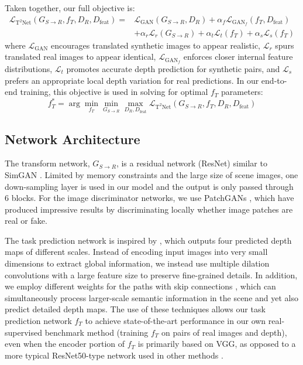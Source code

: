 \documentclass[runningheads]{llncs}
\begin{document}
Taken together, our full objective is:
\begin{align}\label{eq:6}
\mathcal{L}_{\text{T}^2\text{Net}}(G_{S\to R}, f_T, D_R,D_\text{feat}) =
& \mathcal{L}_\text{GAN}(G_{S\to R}, D_R) +  \alpha_{f}\mathcal{L}_{\text{GAN}_{f}}(f_T,D_\text{feat}) \nonumber\\
& + \alpha_{r}\mathcal{L}_{r}(G_{S\to R}) + \alpha_{t}\mathcal{L}_{t}(f_T) + \alpha_{s}\mathcal{L}_{s}(f_T) 
\end{align}
where $\mathcal{L}_\text{GAN}$ encourages translated synthetic images to appear realistic, $\mathcal{L}_{r}$ spurs translated real images to appear identical, $\mathcal{L}_{\text{GAN}_{f}}$ enforces closer internal feature distributions, $\mathcal{L}_t$ promotes accurate depth prediction for synthetic pairs, and $\mathcal{L}_s$ prefers an appropriate local depth variation for real predictions. In our end-to-end training, this objective is used in solving for optimal $f_T$ parameters:
\begin{equation}
f_T^* = \arg \min_{f_T} \min_{G_{S\to R}} \max_{D_R,D_\text{feat}}
\mathcal{L}_{\text{T}^2\text{Net}}(G_{S\to R}, f_T, D_R,D_\text{feat})
\end{equation}


\subsection{Network Architecture}

The transform network, $G_{S\to R}$, is a residual network (ResNet) \cite{he2016deep} similar to SimGAN \cite{shrivastava2017learning}. Limited by memory constraints and the large size of scene images, one down-sampling layer is used in our model and the output is only passed through 6 blocks. For the image discriminator networks, we use PatchGANs \cite{shrivastava2017learning,zhu2017unpaired}, which have produced impressive results by discriminating locally whether image patches are real or fake.

The task prediction network is inspired by \cite{godard2017unsupervised}, which outputs four predicted depth maps of different scales. Instead of encoding input images into very small dimensions to extract global information, we instead use multiple dilation convolutions \cite{YuKoltun2016} with a large feature size to preserve fine-grained details. In addition, we employ different weights for the paths with skip connections \cite{ronneberger2015u}, which can simultaneously process larger-scale semantic information in the scene and yet also predict detailed depth maps. The use of these techniques allows our task prediction network $f_T$ to achieve state-of-the-art performance in our own real-supervised benchmark method (training $f_T$ on pairs of real images and depth), even when the encoder portion of $f_T$ is primarily based on VGG, as opposed to a more typical ResNet50-type network used in other methods \cite{godard2017unsupervised,kuznietsov2017semi}. 
\end{document}

